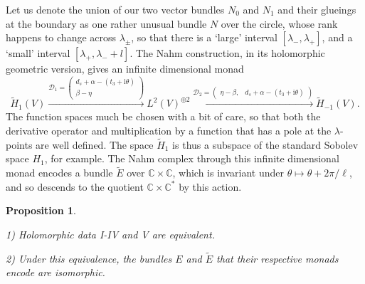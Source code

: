 \documentclass[12pt]{article}
\newtheorem{proposition}[theorem]{Proposition}
\theoremstyle{definition}
\theoremstyle{remark}
\numberwithin{theorem}{section}
\renewcommand{\i}{\mathrm{i}}
\newcommand{\cD}{\mathcal{D}}
\def\bC{{\mathbb {C}}}
\begin{document}
Let us denote the union of our two vector bundles $N_0$ and $N_1$ and their glueings at the boundary as one rather unusual bundle $N$ over the circle, whose rank happens to change across $\lambda_\pm$, so that there is a `large' interval $[\lambda_-, \lambda_+]$, and a `small' interval $[\lambda_+, \lambda_-+l]$. The Nahm construction, in its holomorphic geometric version, gives an infinite dimensional monad
\begin{equation} 
\widetilde{H}_{1}(V) \xrightarrow{\cD_1 = \left(\begin{smallmatrix}  d_s + \alpha -(t_3+\i\theta)\\  \beta- \eta\end{smallmatrix}\right)} L^2(V)^{\oplus 2}\xrightarrow{\cD_2 = \left(\begin{smallmatrix}  \eta-\beta,&d_s + \alpha -(t_3+\i\theta)\end{smallmatrix}\right)} \widetilde{H}_{-1}(V). \end{equation}
The function spaces much be chosen with a bit of care, so that both the derivative operator and multiplication by a function that has a pole at the $\lambda$-points are well defined. The  space $\widetilde{H}_{1}$ is thus a subspace of the standard Sobolev space ${H}_{1}$, for example. The Nahm complex through this infinite dimensional monad encodes a bundle $\widetilde E$ over $\bC\times \bC$, which is invariant under $\theta\mapsto \theta + 2\pi/\ell$, and so descends to  the quotient $\bC\times \bC^*$ by this action. 
\begin{proposition}\cite{Charbonneau:2007zd}

 1) Holomorphic data I-IV and V are equivalent.

2) Under this equivalence, the bundles $E$ and $\widetilde E$ that their respective monads encode are isomorphic.

\end{proposition}
\end{document}
